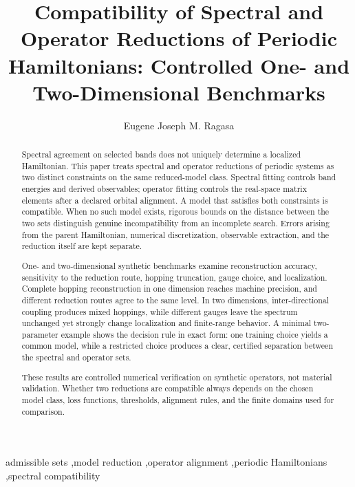 \documentclass[preprint,12pt]{elsarticle}
\begin{document}
\begin{frontmatter}

\title{Compatibility of Spectral and Operator Reductions of Periodic
Hamiltonians: Controlled One- and Two-Dimensional Benchmarks}

\author[dlsu]{Eugene Joseph M. Ragasa}

\address[dlsu]{Department of Physics, De La Salle University,
Manila, Philippines}

\begin{abstract}
Spectral agreement on selected bands does not uniquely determine a localized
Hamiltonian. This paper treats spectral and operator reductions of periodic
systems as two distinct constraints on the same reduced-model class. Spectral
fitting controls band energies and derived observables; operator fitting
controls the real-space matrix elements after a declared orbital alignment. A
model that satisfies both constraints is compatible. When no such model exists,
rigorous bounds on the distance between the two sets distinguish genuine
incompatibility from an incomplete search. Errors arising from the parent
Hamiltonian, numerical discretization, observable extraction, and the reduction
itself are kept separate.

One- and two-dimensional synthetic benchmarks examine reconstruction accuracy,
sensitivity to the reduction route, hopping truncation, gauge choice, and
localization. Complete hopping reconstruction in one dimension reaches machine
precision, and different reduction routes agree to the same level. In two
dimensions, inter-directional coupling produces mixed hoppings, while different
gauges leave the spectrum unchanged yet strongly change localization and
finite-range behavior. A minimal two-parameter example shows the decision rule
in exact form: one training choice yields a common model, while a restricted
choice produces a clear, certified separation between the spectral and operator
sets.

These results are controlled numerical verification on synthetic operators,
not material validation. Whether two reductions are compatible always depends
on the chosen model class, loss functions, thresholds, alignment rules, and the
finite domains used for comparison.
\end{abstract}

\begin{keyword}
admissible sets \sep model reduction \sep operator alignment \sep periodic
Hamiltonians \sep spectral compatibility
\end{keyword}

\end{frontmatter}
\end{document}
